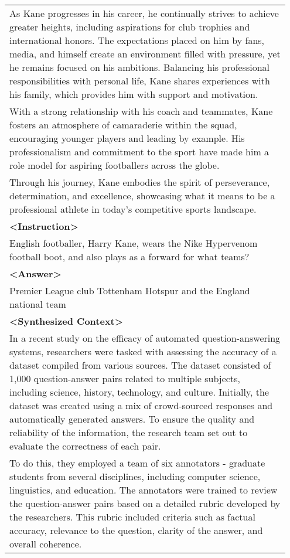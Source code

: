\begin{table*}[]
{\begin{tabular}{p{0.95\linewidth}}
    As Kane progresses in his career, he continually strives to achieve greater heights, including aspirations for club trophies and international honors. The expectations placed on him by fans, media, and himself create an environment filled with pressure, yet he remains focused on his ambitions. Balancing his professional responsibilities with personal life, Kane shares experiences with his family, which provides him with support and motivation. \\ 
    With a strong relationship with his coach and teammates, Kane fosters an atmosphere of camaraderie within the squad, encouraging younger players and leading by example. His professionalism and commitment to the sport have made him a role model for aspiring footballers across the globe. \\
    Through his journey, Kane embodies the spirit of perseverance, determination, and excellence, showcasing what it means to be a professional athlete in today's competitive sports landscape. \\
    \textbf{<Instruction>} \\
    English footballer, Harry Kane, wears the Nike Hypervenom football boot, and also plays as a forward for what teams? \\
    \textbf{<Answer>} \\
    Premier League club Tottenham Hotspur and the England national team \\
    \hline
    \textbf{<Synthesized Context>} \\
    In a recent study on the efficacy of automated question-answering systems, researchers were tasked with assessing the accuracy of a dataset compiled from various sources. The dataset consisted of 1,000 question-answer pairs related to multiple subjects, including science, history, technology, and culture. Initially, the dataset was created using a mix of crowd-sourced responses and automatically generated answers. To ensure the quality and reliability of the information, the research team set out to evaluate the correctness of each pair. \\
    To do this, they employed a team of six annotators - graduate students from several disciplines, including computer science, linguistics, and education. The annotators were trained to review the question-answer pairs based on a detailed rubric developed by the researchers. This rubric included criteria such as factual accuracy, relevance to the question, clarity of the answer, and overall coherence. \\

\end{tabular}}
\end{table*}
